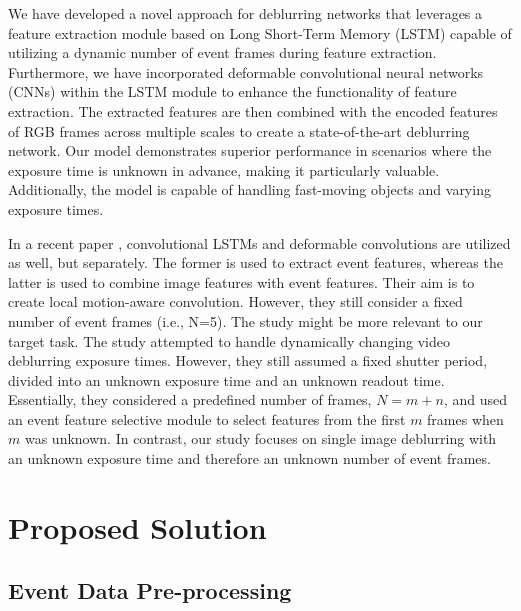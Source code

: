 \documentclass{article}
\begin{document}
We have developed a novel approach for deblurring networks that leverages a feature extraction module based on Long Short-Term Memory (LSTM) capable of utilizing a dynamic number of event frames during feature extraction. Furthermore, we have incorporated deformable convolutional neural networks (CNNs) within the LSTM module to enhance the functionality of feature extraction. The extracted features are then combined with the encoded features of RGB frames across multiple scales to create a state-of-the-art deblurring network. Our model demonstrates superior performance in scenarios where the exposure time is unknown in advance, making it particularly valuable. Additionally, the model is capable of handling fast-moving objects and varying exposure times.

In a recent paper \cite{vitoria2023event}, convolutional LSTMs and deformable convolutions are utilized as well, but separately. The former is used to extract event features, whereas the latter is used to combine image features with event features. Their aim is to create local motion-aware convolution. However, they still consider a fixed number of event frames (i.e., N=5). The study \cite{kim2022event} might be more relevant to our target task. The study \cite{kim2022event} attempted to handle dynamically changing video deblurring exposure times. However, they still assumed a fixed shutter period, divided into an unknown exposure time and an unknown readout time. Essentially, they considered a predefined number of frames, $N=m+n$, and used an event feature selective module to select features from the first $m$ frames when $m$ was unknown. In contrast, our study focuses on single image deblurring with an unknown exposure time and therefore an unknown number of event frames.

\section{Proposed Solution}
\subsection{Event Data Pre-processing}
\end{document}
